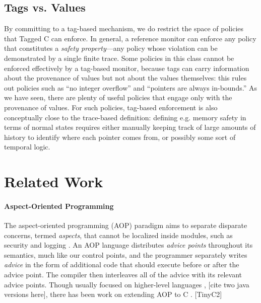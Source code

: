 \documentclass{llncs}
\begin{document}
\subsection{Tags vs. Values}

By committing to a tag-based mechanism, we do restrict the space of policies that Tagged C
can enforce. In general, a reference monitor can enforce any policy that constitutes a
{\em safety property}---any policy whose violation can be demonstrated by a single finite
trace. Some policies in this class cannot be enforced effectively by a tag-based monitor,
because tags can carry information about the provenance of values but not about the values
themselves: this rules out policies such as ``no integer overflow'' and
``pointers are always in-bounds.'' As we have seen, there are plenty of useful policies that
engage only with the provenance of values. For such policies, tag-based enforcement is
also conceptually close to the trace-based definition: defining e.g. memory safety in terms
of normal states requires either manually keeping track of large amounts of history to
identify where each pointer comes from, or possibly some sort of temporal logic.



\section{Related Work}
\label{sec:related}

\paragraph{Aspect-Oriented Programming}

The aspect-oriented programming (AOP) paradigm aims to separate disparate concerns,
termed {\em aspects}, that cannot be localized inside modules, such as security and logging \cite{}. %
An AOP language distributes {\em advice points} throughout its semantics, much like our
control points, and the programmer separately writes {\em advice} in the form of
additional code that should execute before or after the advice point. The compiler
then interleaves all of the advice with its relevant advice points. Though usually
focused on higher-level languages \cite{}, \cite{} [cite two java versions here],
there has been work on extending AOP to C \cite{}. [TinyC2]
\end{document}
